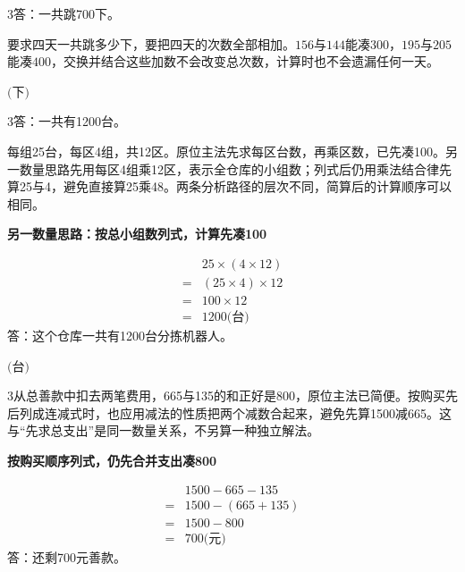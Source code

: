 \documentclass[multi=snippet,border={5bp 20bp 5bp 5bp}]{standalone}
\newenvironment{snippet}[3]{\begin{minipage}{#1bp}\color{answerred}\fontsize{#2}{#3}\selectfont\raggedright}{\end{minipage}}
\begin{document}
\begin{snippet}{505}{11.5}{14}\begin{multicols}{3}\raggedcolumns 答：一共跳700下。\par 要求四天一共跳多少下，要把四天的次数全部相加。\(156\)\allowbreak 与\(144\)\allowbreak 能凑\(300\)\allowbreak ，\(195\)\allowbreak 与\(205\)\allowbreak 能凑\(400\)\allowbreak ，交换并结合这些加数不会改变总次数，计算时也不会遗漏任何一天。\end{multicols}\end{snippet}
\begin{snippet}{80}{10.0}{14}\SourceSans\setlength{\mathindent}{2bp}\(\text{(下)}\)\end{snippet}
\begin{snippet}{505}{11.5}{14}\begin{multicols}{3}\raggedcolumns 答：一共有1200台。\par 每组25台，每区4组，共12区。原位主法先求每区台数，再乘区数，已先凑100。另一数量思路先用每区4组乘12区，表示全仓库的小组数；列式后仍用乘法结合律先算25与4，避免直接算25乘48。两条分析路径的层次不同，简算后的计算顺序可以相同。\par \textbf{另一数量思路：按总小组数列式，计算先凑100}\par \[\begin{aligned}&25\times(4\times12)\\={}&(25\times4)\times12\\={}&100\times12\\={}&1200\text{(台)}\end{aligned}\]答：这个仓库一共有1200台分拣机器人。\end{multicols}\end{snippet}
\begin{snippet}{80}{10.0}{14}\SourceSans\setlength{\mathindent}{2bp}\(\text{(台)}\)\end{snippet}
\begin{snippet}{505}{11.5}{14}\begin{multicols}{3}\raggedcolumns 从总善款中扣去两笔费用，665与135的和正好是800，原位主法已简便。按购买先后列成连减式时，也应用减法的性质把两个减数合起来，避免先算1500减665。这与“先求总支出”是同一数量关系，不另算一种独立解法。\par \textbf{按购买顺序列式，仍先合并支出凑800}\par \[\begin{aligned}&1500-665-135\\={}&1500-(665+135)\\={}&1500-800\\={}&700\text{(元)}\end{aligned}\]答：还剩700元善款。\end{multicols}\end{snippet}
\end{document}
